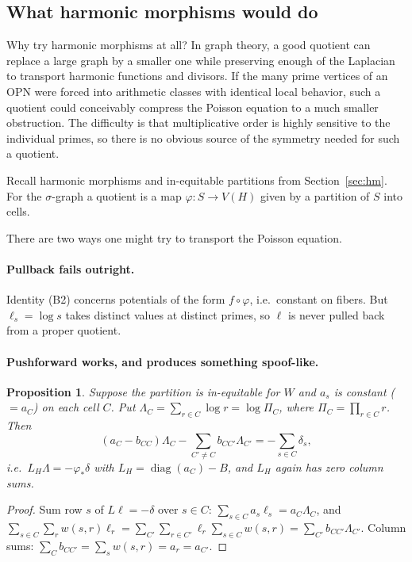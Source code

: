 \documentclass[11pt]{article}
\newtheorem{proposition}[theorem]{Proposition}
\theoremstyle{definition}
\theoremstyle{remark}
\begin{document}
\subsection{What harmonic morphisms would do}\label{sec:harmonic}

Why try harmonic morphisms at all?  In graph theory, a good quotient can
replace a large graph by a smaller one while preserving enough of the
Laplacian to transport harmonic functions and divisors.  If the many prime
vertices of an OPN were forced into arithmetic classes with identical local
behavior, such a quotient could conceivably compress the Poisson equation to
a much smaller obstruction.  The difficulty is that multiplicative order is
highly sensitive to the individual primes, so there is no obvious source of
the symmetry needed for such a quotient.

Recall harmonic morphisms and in-equitable partitions from
Section~\ref{sec:hm}.  For the $\sigma$-graph a quotient is a map
$\varphi\colon S\to V(H)$ given by a partition of $S$ into cells.

There are two ways one might try to transport the Poisson equation.

\paragraph{Pullback fails outright.} Identity (B2) concerns potentials
of the form $f\circ\varphi$, i.e.\ constant on fibers. But $\ell_s=\log s$
takes distinct values at distinct primes, so $\ell$ is never pulled back
from a proper quotient.

\paragraph{Pushforward works, and produces something spoof-like.}

\begin{proposition}\label{prop:quotient}
Suppose the partition is in-equitable for $W$ and $a_s$ is constant
($=a_C$) on each cell $C$. Put $\Lambda_C=\sum_{r\in C}\log r=\log\Pi_C$,
where $\Pi_C=\prod_{r\in C}r$. Then
\[
(a_C-b_{CC})\Lambda_C-\sum_{C'\ne C}b_{CC'}\Lambda_{C'}=-\sum_{s\in C}\delta_s,
\]
i.e.\ $L_H\Lambda=-\varphi_*\delta$ with $L_H=\operatorname{diag}(a_C)-B$,
and $L_H$ again has zero column sums.
\end{proposition}

\begin{proof}
Sum row $s$ of $L\ell=-\delta$ over $s\in C$:
$\sum_{s\in C}a_s\ell_s=a_C\Lambda_C$, and
$\sum_{s\in C}\sum_r w(s,r)\ell_r=\sum_{C'}\sum_{r\in C'}\ell_r\sum_{s\in C}w(s,r)
=\sum_{C'}b_{CC'}\Lambda_{C'}$. Column sums: $\sum_C b_{CC'}=\sum_s w(s,r)=a_r=a_{C'}$.
\end{proof}
\end{document}
